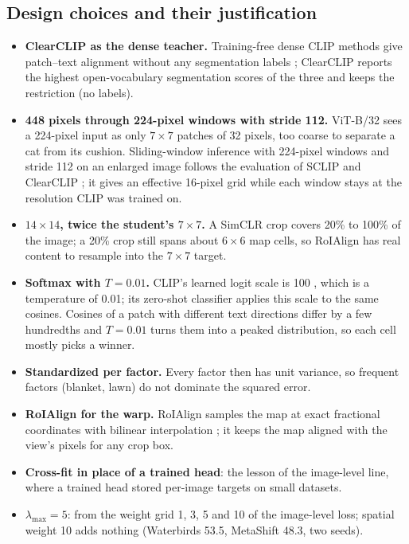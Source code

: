 \documentclass[11pt]{article}
\begin{document}
\subsection{Design choices and their justification}
\begin{itemize}[leftmargin=*]
\item \textbf{ClearCLIP as the dense teacher.} Training-free dense CLIP methods give patch--text alignment without
any segmentation labels \citep{zhou2022maskclip,wang2024sclip,lan2024clearclip}; ClearCLIP reports the highest
open-vocabulary segmentation scores of the three and keeps the restriction (no labels).
\item \textbf{448 pixels through 224-pixel windows with stride 112.} ViT-B/32 sees a 224-pixel input as only
$7\times7$ patches of 32 pixels, too coarse to separate a cat from its cushion. Sliding-window inference with
224-pixel windows and stride 112 on an enlarged image follows the evaluation of SCLIP and ClearCLIP
\citep{wang2024sclip,lan2024clearclip}; it gives an effective 16-pixel grid while each window stays at the resolution
CLIP was trained on.
\item \textbf{$14\times14$, twice the student's $7\times7$.} A SimCLR crop covers 20\% to 100\% of the image; a 20\%
crop still spans about $6\times6$ map cells, so RoIAlign has real content to resample into the $7\times7$ target.
\item \textbf{Softmax with $T=0.01$.} CLIP's learned logit scale is 100 \citep{radford2021clip}, which is a
temperature of 0.01; its zero-shot classifier applies this scale to the same cosines. Cosines of a patch with
different text directions differ by a few hundredths and $T=0.01$ turns them into a peaked distribution, so each cell
mostly picks a winner.
\item \textbf{Standardized per factor.} Every factor then has unit variance, so frequent factors (blanket, lawn) do
not dominate the squared error.
\item \textbf{RoIAlign for the warp.} RoIAlign samples the map at exact fractional coordinates with bilinear
interpolation \citep{he2017maskrcnn}; it keeps the map aligned with the view's pixels for any crop box.
\item \textbf{Cross-fit in place of a trained head}: the lesson of the image-level line, where a trained head stored
per-image targets on small datasets.
\item \textbf{$\lambda_{\max}=5$}: from the weight grid 1, 3, 5 and 10 of the image-level loss; spatial weight 10 adds
nothing (Waterbirds 53.5, MetaShift 48.3, two seeds).

\end{itemize}
\end{document}
